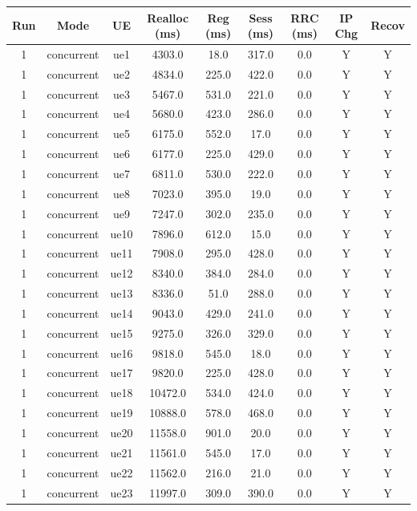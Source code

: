 \begin{table}[ht]
\centering
\begin{tabular}{|c|c|c|c|c|c|c|c|c|}
\hline
Run & Mode & UE & Realloc (ms) & Reg (ms) & Sess (ms) & RRC (ms) & IP Chg & Recov \\
\hline
1 & concurrent & ue1 & 4303.0 & 18.0 & 317.0 & 0.0 & Y & Y \\
1 & concurrent & ue2 & 4834.0 & 225.0 & 422.0 & 0.0 & Y & Y \\
1 & concurrent & ue3 & 5467.0 & 531.0 & 221.0 & 0.0 & Y & Y \\
1 & concurrent & ue4 & 5680.0 & 423.0 & 286.0 & 0.0 & Y & Y \\
1 & concurrent & ue5 & 6175.0 & 552.0 & 17.0 & 0.0 & Y & Y \\
1 & concurrent & ue6 & 6177.0 & 225.0 & 429.0 & 0.0 & Y & Y \\
1 & concurrent & ue7 & 6811.0 & 530.0 & 222.0 & 0.0 & Y & Y \\
1 & concurrent & ue8 & 7023.0 & 395.0 & 19.0 & 0.0 & Y & Y \\
1 & concurrent & ue9 & 7247.0 & 302.0 & 235.0 & 0.0 & Y & Y \\
1 & concurrent & ue10 & 7896.0 & 612.0 & 15.0 & 0.0 & Y & Y \\
1 & concurrent & ue11 & 7908.0 & 295.0 & 428.0 & 0.0 & Y & Y \\
1 & concurrent & ue12 & 8340.0 & 384.0 & 284.0 & 0.0 & Y & Y \\
1 & concurrent & ue13 & 8336.0 & 51.0 & 288.0 & 0.0 & Y & Y \\
1 & concurrent & ue14 & 9043.0 & 429.0 & 241.0 & 0.0 & Y & Y \\
1 & concurrent & ue15 & 9275.0 & 326.0 & 329.0 & 0.0 & Y & Y \\
1 & concurrent & ue16 & 9818.0 & 545.0 & 18.0 & 0.0 & Y & Y \\
1 & concurrent & ue17 & 9820.0 & 225.0 & 428.0 & 0.0 & Y & Y \\
1 & concurrent & ue18 & 10472.0 & 534.0 & 424.0 & 0.0 & Y & Y \\
1 & concurrent & ue19 & 10888.0 & 578.0 & 468.0 & 0.0 & Y & Y \\
1 & concurrent & ue20 & 11558.0 & 901.0 & 20.0 & 0.0 & Y & Y \\
1 & concurrent & ue21 & 11561.0 & 545.0 & 17.0 & 0.0 & Y & Y \\
1 & concurrent & ue22 & 11562.0 & 216.0 & 21.0 & 0.0 & Y & Y \\
1 & concurrent & ue23 & 11997.0 & 309.0 & 390.0 & 0.0 & Y & Y \\

\end{tabular}
\end{table}

